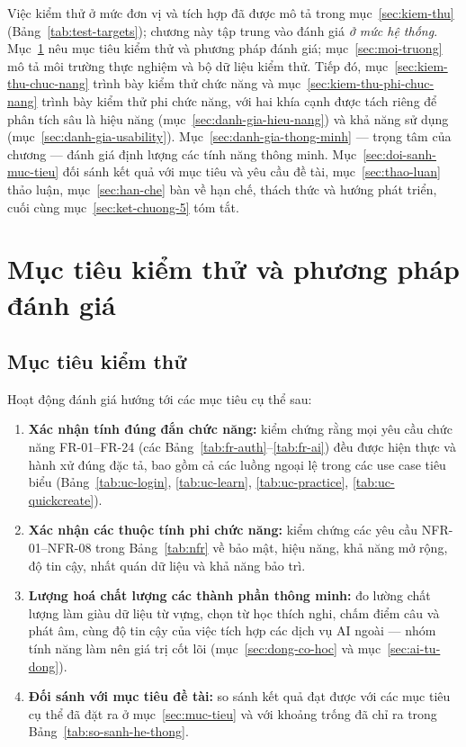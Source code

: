 Việc kiểm thử ở mức đơn vị và tích hợp đã được mô tả trong
mục~\ref{sec:kiem-thu} (Bảng~\ref{tab:test-targets}); chương này tập trung
vào đánh giá \textit{ở mức hệ thống}. Mục~\ref{sec:muc-tieu-kiem-thu} nêu mục
tiêu kiểm thử và phương pháp đánh giá; mục~\ref{sec:moi-truong} mô tả môi
trường thực nghiệm và bộ dữ liệu kiểm thử. Tiếp đó,
mục~\ref{sec:kiem-thu-chuc-nang} trình bày kiểm thử chức năng và
mục~\ref{sec:kiem-thu-phi-chuc-nang} trình bày kiểm thử phi chức năng, với
hai khía cạnh được tách riêng để phân tích sâu là hiệu năng
(mục~\ref{sec:danh-gia-hieu-nang}) và khả năng sử dụng
(mục~\ref{sec:danh-gia-usability}). Mục~\ref{sec:danh-gia-thong-minh} ---
trọng tâm của chương --- đánh giá định lượng các tính năng thông minh.
Mục~\ref{sec:doi-sanh-muc-tieu} đối sánh kết quả với mục tiêu và yêu cầu đề
tài, mục~\ref{sec:thao-luan} thảo luận, mục~\ref{sec:han-che} bàn về hạn chế,
thách thức và hướng phát triển, cuối cùng mục~\ref{sec:ket-chuong-5} tóm tắt.

\section{Mục tiêu kiểm thử và phương pháp đánh giá}
\label{sec:muc-tieu-kiem-thu}

\subsection{Mục tiêu kiểm thử}
\label{subsec:muc-tieu-kt}

Hoạt động đánh giá hướng tới các mục tiêu cụ thể sau:

\begin{enumerate}
  \item \textbf{Xác nhận tính đúng đắn chức năng:} kiểm chứng rằng mọi yêu
        cầu chức năng FR-01--FR-24 (các Bảng~\ref{tab:fr-auth}--\ref{tab:fr-ai})
        đều được hiện thực và hành xử đúng đặc tả, bao gồm cả các luồng ngoại
        lệ trong các use case tiêu biểu (Bảng~\ref{tab:uc-login},
        \ref{tab:uc-learn}, \ref{tab:uc-practice}, \ref{tab:uc-quickcreate}).
  \item \textbf{Xác nhận các thuộc tính phi chức năng:} kiểm chứng các yêu
        cầu NFR-01--NFR-08 trong Bảng~\ref{tab:nfr} về bảo mật, hiệu năng,
        khả năng mở rộng, độ tin cậy, nhất quán dữ liệu và khả năng bảo trì.
  \item \textbf{Lượng hoá chất lượng các thành phần thông minh:} đo lường
        chất lượng làm giàu dữ liệu từ vựng, chọn từ học thích nghi, chấm
        điểm câu và phát âm, cùng độ tin cậy của việc tích hợp các dịch vụ AI
        ngoài --- nhóm tính năng làm nên giá trị cốt lõi
        (mục~\ref{sec:dong-co-hoc} và mục~\ref{sec:ai-tu-dong}).
  \item \textbf{Đối sánh với mục tiêu đề tài:} so sánh kết quả đạt được với
        các mục tiêu cụ thể đã đặt ra ở mục~\ref{sec:muc-tieu} và với khoảng
        trống đã chỉ ra trong Bảng~\ref{tab:so-sanh-he-thong}.
\end{enumerate}

